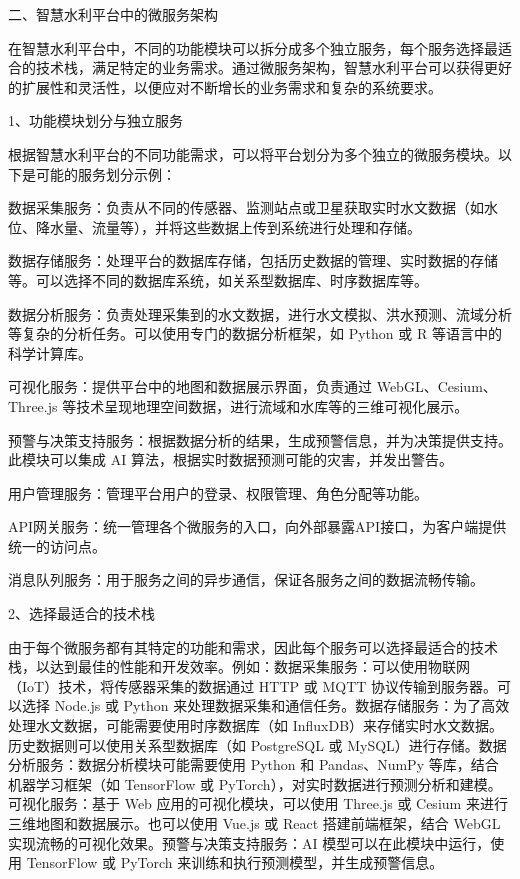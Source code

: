 二、智慧水利平台中的微服务架构

在智慧水利平台中，不同的功能模块可以拆分成多个独立服务，每个服务选择最适合的技术栈，满足特定的业务需求。通过微服务架构，智慧水利平台可以获得更好的扩展性和灵活性，以便应对不断增长的业务需求和复杂的系统要求。

1、功能模块划分与独立服务

根据智慧水利平台的不同功能需求，可以将平台划分为多个独立的微服务模块。以下是可能的服务划分示例：

数据采集服务：负责从不同的传感器、监测站点或卫星获取实时水文数据（如水位、降水量、流量等），并将这些数据上传到系统进行处理和存储。

数据存储服务：处理平台的数据库存储，包括历史数据的管理、实时数据的存储等。可以选择不同的数据库系统，如关系型数据库、时序数据库等。

数据分析服务：负责处理采集到的水文数据，进行水文模拟、洪水预测、流域分析等复杂的分析任务。可以使用专门的数据分析框架，如 Python 或 R 等语言中的科学计算库。

可视化服务：提供平台中的地图和数据展示界面，负责通过 WebGL、Cesium、Three.js 等技术呈现地理空间数据，进行流域和水库等的三维可视化展示。

预警与决策支持服务：根据数据分析的结果，生成预警信息，并为决策提供支持。此模块可以集成 AI 算法，根据实时数据预测可能的灾害，并发出警告。

用户管理服务：管理平台用户的登录、权限管理、角色分配等功能。

API网关服务：统一管理各个微服务的入口，向外部暴露API接口，为客户端提供统一的访问点。

消息队列服务：用于服务之间的异步通信，保证各服务之间的数据流畅传输。

2、选择最适合的技术栈

由于每个微服务都有其特定的功能和需求，因此每个服务可以选择最适合的技术栈，以达到最佳的性能和开发效率。例如：数据采集服务：可以使用物联网（IoT）技术，将传感器采集的数据通过 HTTP 或 MQTT 协议传输到服务器。可以选择 Node.js 或 Python 来处理数据采集和通信任务。数据存储服务：为了高效处理水文数据，可能需要使用时序数据库（如 InfluxDB）来存储实时水文数据。历史数据则可以使用关系型数据库（如 PostgreSQL 或 MySQL）进行存储。数据分析服务：数据分析模块可能需要使用 Python 和 Pandas、NumPy 等库，结合机器学习框架（如 TensorFlow 或 PyTorch），对实时数据进行预测分析和建模。可视化服务：基于 Web 应用的可视化模块，可以使用 Three.js 或 Cesium 来进行三维地图和数据展示。也可以使用 Vue.js 或 React 搭建前端框架，结合 WebGL 实现流畅的可视化效果。预警与决策支持服务：AI 模型可以在此模块中运行，使用 TensorFlow 或 PyTorch 来训练和执行预测模型，并生成预警信息。

